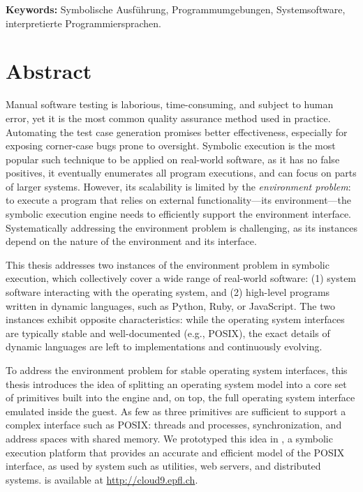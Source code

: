 \noindent \textbf{Keywords:} Symbolische Ausführung, Programmumgebungen, Systemsoftware, interpretierte Programmiersprachen.

\chapter*{Abstract}

Manual software testing is laborious, time-consuming, and subject to human error, yet it is the most common quality assurance method used in practice.
%
Automating the test case generation promises better effectiveness, especially for exposing corner-case bugs prone to oversight.
%
Symbolic execution is the most popular such technique to be applied on real-world software, as it has no false positives, it eventually enumerates all program executions, and can focus on parts of larger systems.
%
However, its scalability is limited by the \emph{environment problem}: to execute a program that relies on external functionality---its environment---the symbolic execution engine needs to efficiently support the environment interface.
%
Systematically addressing the environment problem is challenging, as its instances depend on the nature of the environment and its interface.

This thesis addresses two instances of the environment problem in symbolic execution, which collectively cover a wide range of real-world software: (1) system software interacting with the operating system, and (2) high-level programs written in dynamic languages, such as Python, Ruby, or JavaScript.
%
The two instances exhibit opposite characteristics: while the operating system interfaces are typically stable and well-documented (e.g., POSIX), the exact details of dynamic languages are left to implementations and continuously evolving.

To address the environment problem for stable operating system interfaces, this thesis introduces the idea of splitting an operating system model into a core set of primitives built into the engine and, on top, the full operating system interface emulated inside the guest.
%
As few as three primitives are sufficient to support a complex interface such as POSIX: threads and processes, synchronization, and address spaces with shared memory.
%
We prototyped this idea in \emph{\cnine}, a symbolic execution platform that provides an accurate and efficient model of the POSIX interface, as used by system such as utilities, web servers, and distributed systems.
%
\cnine is available at {\url{http://cloud9.epfl.ch}}.

